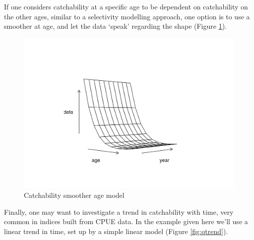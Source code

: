 \documentclass[
]{book}
\newenvironment{Shaded}{\begin{snugshade}}{\end{snugshade}}
\newcommand{\AttributeTok}[1]{\textcolor[rgb]{0.13,0.29,0.53}{#1}}
\newcommand{\DecValTok}[1]{\textcolor[rgb]{0.00,0.00,0.81}{#1}}
\newcommand{\FunctionTok}[1]{\textcolor[rgb]{0.13,0.29,0.53}{\textbf{#1}}}
\newcommand{\NormalTok}[1]{#1}
\newcommand{\OtherTok}[1]{\textcolor[rgb]{0.56,0.35,0.01}{#1}}
\newcommand{\SpecialCharTok}[1]{\textcolor[rgb]{0.81,0.36,0.00}{\textbf{#1}}}
\newcommand{\StringTok}[1]{\textcolor[rgb]{0.31,0.60,0.02}{#1}}
\begin{document}
If one considers catchability at a specific age to be dependent on catchability on the other ages, similar to a selectivity modelling approach, one option is to use a smoother at age, and let the data `speak' regarding the shape (Figure \ref{fig:smoothage}).

\begin{Shaded}
\end{Shaded}

\begin{figure}
\centering
\includegraphics{_bookdown_files/_main_files/figure-html/smoothage-1.png}
\caption{\label{fig:smoothage}Catchability smoother age model}
\end{figure}

Finally, one may want to investigate a trend in catchability with time, very common in indices built from CPUE data. In the example given here we'll use a linear trend in time, set up by a simple linear model (Figure \ref{fig:qtrend}).
\end{document}
